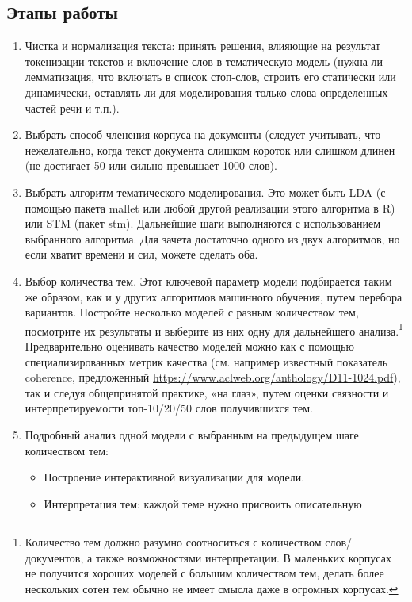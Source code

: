 \documentclass{report}
\begin{document}
\subsection{Этапы работы}

\begin{enumerate}
\item Чистка и нормализация текста: принять решения, влияющие на
  результат токенизации текстов и включение слов в тематическую модель
  (нужна ли лемматизация, что включать в список стоп-слов, строить его
  статически или динамически, оставлять ли для моделирования только
  слова определенных частей речи и т.п.).
\item Выбрать способ членения корпуса на документы (следует учитывать,
  что нежелательно, когда текст документа слишком короток или слишком
  длинен (не достигает 50 или сильно превышает 1000 слов).
\item Выбрать алгоритм тематического моделирования. Это может быть LDA
  (с помощью пакета mallet или любой другой реализации этого
  алгоритма в R) или STM (пакет stm). Дальнейшие шаги выполняются с
  использованием выбранного алгоритма. Для зачета достаточно одного из
  двух алгоритмов, но если хватит времени и сил, можете сделать оба.
\item Выбор количества тем. Этот ключевой параметр модели подбирается
  таким же образом, как и у других алгоритмов машинного обучения,
  путем перебора вариантов. Постройте несколько моделей с разным
  количеством тем, посмотрите их результаты и выберите из них одну для
  дальнейшего анализа.\footnote{Количество тем должно разумно
    соотноситься с количеством слов/документов, а также возможностями
    интерпретации. В маленьких корпусах не получится хороших моделей с
    большим количеством тем, делать более нескольких сотен тем обычно
    не имеет смысла даже в огромных корпусах.} Предварительно
  оценивать качество моделей можно как с помощью специализированных
  метрик качества (см. например известный показатель coherence,
  предложенный \href{Mimno et
    al.}{https://www.aclweb.org/anthology/D11-1024.pdf}), так и следуя
  общепринятой практике, «на глаз», путем оценки связности и
  интерпретируемости топ-10/20/50 слов получившихся тем.
\item Подробный анализ одной модели с выбранным на предыдущем шаге
  количеством тем:
  \begin{itemize}
  \item Построение интерактивной визуализации для модели.
  \item Интерпретация тем: каждой теме нужно присвоить описательную

\end{itemize}
\end{enumerate}
\end{document}
